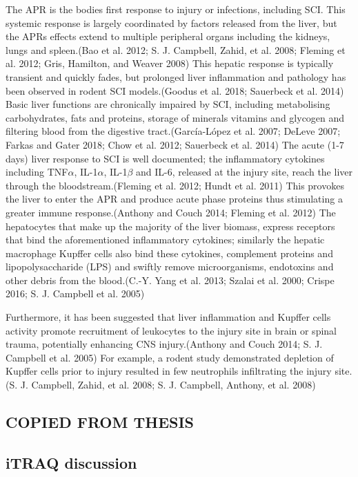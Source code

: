 \documentclass[9pt,lineno]{elife}
\begin{document}
The APR is the bodies first response to injury or infections, including SCI.
This systemic response is largely coordinated by factors released from the liver, but the APRs effects extend to multiple peripheral organs including the kidneys, lungs and spleen.(Bao et al. 2012; S. J. Campbell, Zahid, et al. 2008; Fleming et al. 2012; Gris, Hamilton, and Weaver 2008)
This hepatic response is typically transient and quickly fades, but prolonged liver inflammation and pathology has been observed in rodent SCI models.(Goodus et al. 2018; Sauerbeck et al. 2014)
Basic liver functions are chronically impaired by SCI, including metabolising carbohydrates, fats and proteins, storage of minerals vitamins and glycogen and filtering blood from the digestive tract.(García-López et al. 2007; DeLeve 2007; Farkas and Gater 2018; Chow et al. 2012; Sauerbeck et al. 2014)
The acute (1-7 days) liver response to SCI is well documented; the inflammatory cytokines including TNF\(\alpha\), IL-1\(\alpha\), IL-1\(\beta\) and IL-6, released at the injury site, reach the liver through the bloodstream.(Fleming et al. 2012; Hundt et al. 2011)
This provokes the liver to enter the APR and produce acute phase proteins thus stimulating a greater immune response.(Anthony and Couch 2014; Fleming et al. 2012)
The hepatocytes that make up the majority of the liver biomass, express receptors that bind the aforementioned inflammatory cytokines; similarly the hepatic macrophage Kupffer cells also bind these cytokines, complement proteins and lipopolysaccharide (LPS) and swiftly remove microorganisms, endotoxins and other debris from the blood.(C.-Y. Yang et al. 2013; Szalai et al. 2000; Crispe 2016; S. J. Campbell et al. 2005)

Furthermore, it has been suggested that liver inflammation and Kupffer cells activity promote recruitment of leukocytes to the injury site in brain or spinal trauma, potentially enhancing CNS injury.(Anthony and Couch 2014; S. J. Campbell et al. 2005)
For example, a rodent study demonstrated depletion of Kupffer cells prior to injury resulted in few neutrophils infiltrating the injury site.(S. J. Campbell, Zahid, et al. 2008; S. J. Campbell, Anthony, et al. 2008)

\hypertarget{copied-from-thesis}{%
\subsection{COPIED FROM THESIS}\label{copied-from-thesis}}

\hypertarget{itraq-discussion}{%
\subsection{iTRAQ discussion}\label{itraq-discussion}}
\end{document}
